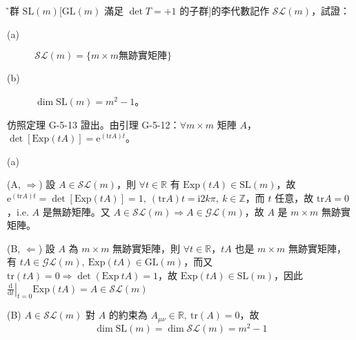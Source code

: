 \documentclass{article}
\begin{document}
\section{}
\~ 李群 $\mathrm{SL}(m)$[$\mathrm{GL}(m)$ 滿足 $\det T=+1$ 的子群]的李代數記作 $\mathscr{SL}(m)$，試證：
\begin{description}
  \item[(a)] $\mathscr{SL}(m)=\{m \times m \text{無跡實矩陣}\}$
  \item[(b)] $\dim \mathrm{SL}(m)=m^2-1$。
\end{description}
仿照定理 G-5-13 證出。由引理 G-5-12：$\forall m\times m$ 矩陣 $A$，$\det[\mathrm{Exp}(tA)]=\mathrm{e}^{(\mathrm{tr}A)t}$。
\begin{framed}
  (a)

  (A, $\Rightarrow$)
  設 $A\in\mathscr{SL}(m)$，則 $\forall t \in\mathbb{R}$ 有 $\mathrm{Exp}(tA)\in\mathrm{SL}(m)$，故 $\mathrm{e}^{(\mathrm{tr}A)t}=\det[\mathrm{Exp}(tA)]=1,\ (\mathrm{tr}A)t=\mathrm{i}2k\pi,\ k\in\mathbb{Z}$，而 $t$ 任意，故 $\mathrm{tr}A=0$，i.e. $A$ 是無跡矩陣。又 $A\in\mathscr{SL}(m)\Rightarrow A\in\mathscr{GL}(m)$，故 $A$ 是 $m\times m$ 無跡實矩陣。

  (B, $\Leftarrow$)
  設 $A$ 為 $m\times m$ 無跡實矩陣，則 $\forall t\in \mathbb{R}$，$tA$ 也是 $m\times m$ 無跡實矩陣，有 $tA\in\mathscr{GL}(m),\ \mathrm{Exp}(tA)\in\mathrm{GL}(m)$，而又 $\mathrm{tr}(tA)=0\Rightarrow \det(\mathrm{Exp}\ tA)=1$，故 $\mathrm{Exp}(tA)\in\mathrm{SL}(m)$，因此 $\left.\frac{\mathrm{d}}{\mathrm{d}t}\right|_{t=0}\mathrm{Exp}(tA)=A\in\mathscr{SL}(m)$

  (B)
  $A\in\mathscr{SL}(m)$ 對 $A$ 的約束為 $A_{\mu\nu}\in\mathbb{R},\ \mathrm{tr}(A)=0$，故
  $$
    \dim\mathrm{SL}(m)=\dim\mathscr{SL}(m)=m^2-1
  $$
\end{framed}
\end{document}
